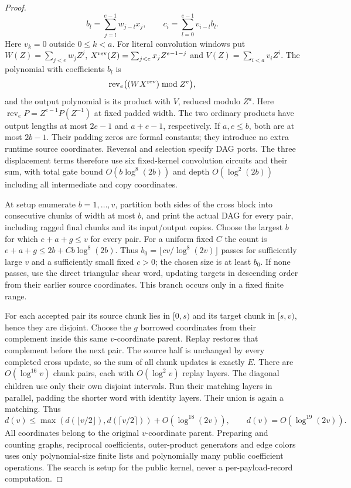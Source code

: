 \begin{proof}
\[
 b_l=\sum_{j=l}^{e-1}w_{j-l}x_j,\qquad
 c_i=\sum_{l=0}^{e-1}v_{i-l}b_l.
\]
Here $v_k=0$ outside $0\le k<a$.
For literal convolution windows put
$W(Z)=\sum_{j<e}w_jZ^j$, $X^{\rm rev}(Z)=\sum_{j<e}x_jZ^{e-1-j}$
and $V(Z)=\sum_{i<a}v_iZ^i$. The polynomial with coefficients $b_l$ is
\[
 \operatorname{rev}_e\bigl((W X^{\rm rev})\bmod Z^e\bigr),
\]
and the output polynomial is its product with $V$, reduced modulo $Z^a$.
Here $\operatorname{rev}_e P=Z^{e-1}P(Z^{-1})$ at fixed padded width.
The two ordinary products have output lengths at most $2e-1$ and
$a+e-1$, respectively. If $a,e\le b$, both are at most $2b-1$.
Their padding zeros are formal constants; they introduce no extra
runtime source coordinates. Reversal and selection specify DAG ports.
The three displacement terms therefore use six fixed-kernel convolution
circuits and their sum, with total gate bound $O(b\log^8(2b))$ and
depth $O(\log^2(2b))$ including all intermediate and copy coordinates.

At setup enumerate $b=1,\ldots,v$, partition both sides of the cross
block into consecutive chunks of width at most $b$, and print the
actual DAG for every pair, including ragged final chunks and its
input/output copies. Choose the largest $b$ for which
$e+a+g\le v$ for every pair. For a uniform fixed $C$ the count is
$e+a+g\le2b+Cb\log^8(2b)$. Thus
$b_0=\lfloor c v/\log^8(2v)\rfloor$ passes for sufficiently large $v$
and a sufficiently small fixed $c>0$; the chosen size is at least $b_0$.
If none passes, use the direct triangular shear word, updating targets
in descending order from their earlier source coordinates.
This branch occurs only in a fixed finite range.

For each accepted pair its source chunk lies in $[0,s)$ and its target
chunk in $[s,v)$, hence they are disjoint. Choose the $g$ borrowed
coordinates from their complement inside this same $v$-coordinate
parent. Replay restores that complement before the next pair.
The source half is unchanged by every completed cross update, so the
sum of all chunk updates is exactly $E$.
There are
$O(\log^{16}v)$ chunk pairs, each with $O(\log^2v)$ replay layers.
The diagonal children use only their own disjoint intervals.
Run their matching layers in parallel, padding the shorter word
with identity layers. Their union is again a matching. Thus
\[
 d(v)\le\max(d(\lfloor v/2\rfloor),d(\lceil v/2\rceil))
       +O(\log^{18}(2v)),\qquad d(v)=O(\log^{19}(2v)).
\]
All coordinates belong to the original $v$-coordinate parent. Preparing
and counting graphs, reciprocal coefficients, outer-product generators
and edge colors uses only polynomial-size finite lists and polynomially
many public coefficient operations. The search is setup for the public
kernel, never a per-payload-record computation.
\end{proof}

